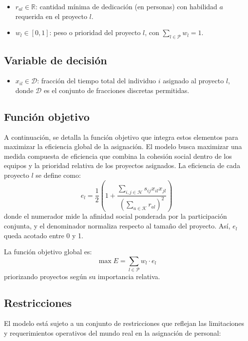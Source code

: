 \documentclass[conference]{IEEEtran}
\begin{document}
\begin{itemize}
    \item $r_{al} \in \mathbb{R}$: cantidad mínima de dedicación (en personas) con habilidad $a$ requerida en el proyecto $l$.
    \item $w_l \in [0,1]$: peso o prioridad del proyecto $l$, con $\sum_{l \in \mathcal{P}} w_l = 1$.
\end{itemize}

\subsection{Variable de decisión}

\begin{itemize}
    \item \(x_{il} \in \mathcal{D}\): fracción del tiempo total del individuo \(i\) asignado al proyecto \(l\), donde \(\mathcal{D}\) es el conjunto de fracciones discretas permitidas.
\end{itemize}

\subsection{Función objetivo}

A continuación, se detalla la función objetivo que integra estos elementos para maximizar la eficiencia global de la asignación.
El modelo busca maximizar una medida compuesta de eficiencia que combina la cohesión social dentro de los equipos y la prioridad relativa de los proyectos asignados. La eficiencia de cada proyecto \(l\) se define como:
\begin{equation}
    e_l = \frac{1}{2} \left( 1 + \frac{\sum_{i,j \in \mathcal{H}} s_{ij} x_{il} x_{jl}}{\left(\sum_{a \in \mathcal{K}} r_{al}\right)^2} \right)
    \label{eq:efficiency_project_updated}
\end{equation}
donde el numerador mide la afinidad social ponderada por la participación conjunta, y el denominador normaliza respecto al tamaño del proyecto. Así, \(e_l\) queda acotado entre 0 y 1.

La función objetivo global es:
\begin{equation}
    \max E = \sum_{l \in \mathcal{P}} w_l \cdot e_l
    \label{eq:objective_total_updated}
\end{equation}
priorizando proyectos según su importancia relativa.

\subsection{Restricciones}
El modelo está sujeto a un conjunto de restricciones que reflejan las limitaciones y requerimientos operativos del mundo real en la asignación de personal:
\end{document}
